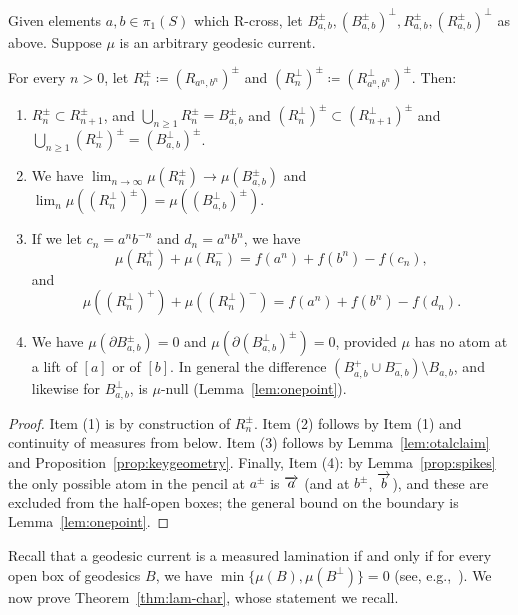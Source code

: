 \begin{lemma} 
Given elements $a, b \in \pi_1(S)$ which R-cross,
let $B_{a,b}^{\pm}, (B_{a,b}^{\pm})^{\perp}, R_{a,b}^{\pm}, (R_{a,b}^{\pm})^\perp$ as above. Suppose $\mu$ is an arbitrary geodesic current.

For every $n > 0$, let $R_n^{\pm}  \coloneqq (R_{a^n,b^n})^{\pm} $ and $(R_n^{\perp})^{\pm}  \coloneqq (R_{a^n,b^n}^{\perp})^{\pm}$.
Then:
\begin{enumerate} 
\item $R_n^{\pm}  \subset R_{n+1}^{\pm}$, and $\bigcup_{n \geq 1} R_n^{\pm}  = B_{a,b}^{\pm}$ and $(R_n^{\perp})^{\pm}  \subset (R_{n+1}^{\perp})^{\pm}$ and $\bigcup_{n \geq 1} (R_n^{\perp})^{\pm} = (B_{a,b}^{\perp})^{\pm}$.
\item We have $\lim_{n \to \infty} \mu(R_n^{\pm}) \to \mu(B_{a,b}^{\pm})$ and $\lim_n \mu((R_n^{\perp})^{\pm})=\mu((B_{a,b}^{\perp})^{\pm})$.
\item  If we let $c_n=a^n b^{-n}$ and $d_n=a^n b^n$, we have 
\begin{equation}\label{eq:Rn-meas}
\mu(R_n^+)+\mu(R_n^-)=f(a^n) + f(b^n)-f(c_n),
\end{equation}
and
\begin{equation}\label{eq:Rn-perp-meas}
\mu((R_n^\perp)^{+}) + \mu((R_n^\perp)^{-})=f(a^n) + f(b^n) -f(d_n).
\end{equation}
\item We have $\mu(\partial B_{a,b}^{\pm})=0$ and
$\mu(\partial (B_{a,b}^{\perp})^{\pm})=0$, provided $\mu$ has no atom at a
lift of $[a]$ or of $[b]$. In general the difference
$(B_{a,b}^+\cup B_{a,b}^-)\setminus B_{a,b}$, and likewise for
$B_{a,b}^{\perp}$, is $\mu$-null (Lemma~\ref{lem:onepoint}).
\end{enumerate}
\label{lem:measures_parallelogram}
\end{lemma}
\begin{proof}
Item (1) is by construction of $R_n^{\pm}$.
Item (2) follows by Item (1) and continuity of measures from below.
Item (3) follows by Lemma~\ref{lem:otalclaim} and
Proposition~\ref{prop:keygeometry}. Finally, Item (4): by
Lemma~\ref{prop:spikes} the only possible atom in the pencil at
$a^\pm$ is $\overrightarrow{a}$ (and at $b^\pm$, $\overrightarrow{b}$), and these are
excluded from the half-open boxes; the general bound on the boundary
is Lemma~\ref{lem:onepoint}.
\end{proof}

Recall that a geodesic current is a measured lamination if and only if for every open box of geodesics $B$, we have $\min \{\mu(B),\mu(B^{\perp})\}=0$ (see, e.g.,~\cite[Proposition~2.1]{BIPP24:PositiveCrossratios}).
We now prove  Theorem~\ref{thm:lam-char}, whose statement we recall.


